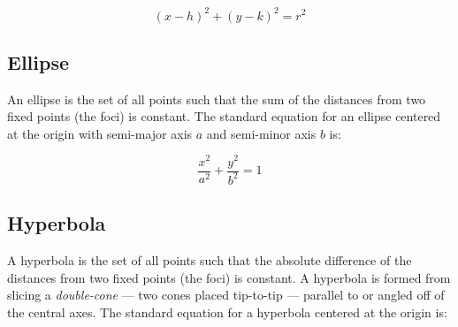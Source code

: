\begin{equation}
(x - h)^2 + (y - k)^2 = r^2
\end{equation}

\begin{center}
  
\end{center}


\subsection{Ellipse}

An ellipse is the set of all points such that the sum of the distances
from two fixed points (the foci) is constant. The standard equation
for an ellipse centered at the origin with semi-major axis $a$ and
semi-minor axis $b$ is:

\begin{equation}
\frac{x^2}{a^2} + \frac{y^2}{b^2} = 1
\end{equation}

\begin{center}
\end{center}
\subsection{Hyperbola}

A hyperbola is the set of all points such that the absolute difference
of the distances from two fixed points (the foci) is constant. A hyperbola is formed from slicing a \emph{double-cone} --- two cones placed tip-to-tip --- parallel to or angled off of the central axes.  The
standard equation for a hyperbola centered at the origin is:

